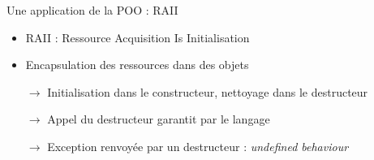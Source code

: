 \begin{frame}{Une application de la POO : RAII}
  \begin{itemize}
  \item RAII : Ressource Acquisition Is Initialisation
  \item Encapsulation des ressources dans des objets
  \item[$\rightarrow$] Initialisation dans le constructeur, nettoyage dans le destructeur
  \item[$\rightarrow$] Appel du destructeur garantit par le langage
  \item[$\rightarrow$] Exception renvoyée par un destructeur : \textit{undefined behaviour}
  \end{itemize}
\end{frame}
